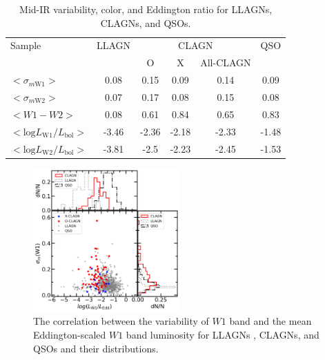 \documentclass[linenumbers]{aastex631}
\begin{document}
\begin{table}
 \caption{Mid-IR variability, color, and Eddington ratio for LLAGNs, CLAGNs, and QSOs.
}
 \label{table_MIR_var_cor_lum}
 \begin{center}
 \begin{tabular}{lccccc}
 \hline\hline
Sample             & LLAGN &   \multicolumn{3}{c}{CLAGN}        & QSO  \\ 
                   &        &   O & X   & All-CLAGN         &       \\ \hline
$<\sigma_{m \mathrm{W1}}>$    &  0.08      & 0.15    &  0.09  &   0.14   &   0.09  \\ 
$<\sigma_{m \mathrm{W2}}>$    &  0.07      &   0.17 &  0.08   &    0.15  &   0.08    \\ 
$<W1-W2>$          &   0.08      &  0.61   & 0.84      &    0.65    &   0.83   \\ 
$<\mathrm{log} L_\mathrm{W1}/L_\mathrm{bol}>$ & -3.46  &  -2.36  &  -2.18   &  -2.33   &  -1.48\\ 
$<\mathrm{log} L_\mathrm{W2}/L_\mathrm{bol}>$ & -3.81  &   -2.5   &  -2.23   &  -2.45   &   -1.53  \\  
\hline\hline
\end{tabular}
\end{center}
\end{table}

\begin{figure}
\centering
	\includegraphics[width=0.5\textwidth]{pic/WISE_var_LW1_Ledd_hist.png}
    \caption{The correlation between the variability of $W1$ band and the mean Eddington-scaled $W1$ band luminosity for LLAGNs \citep{2009MNRAS.399..349G}, CLAGNs, and QSOs \citep{2007ApJ...667..131G} and their distributions. }
    \label{fig:var_ledd_hist}
\end{figure}
\end{document}

